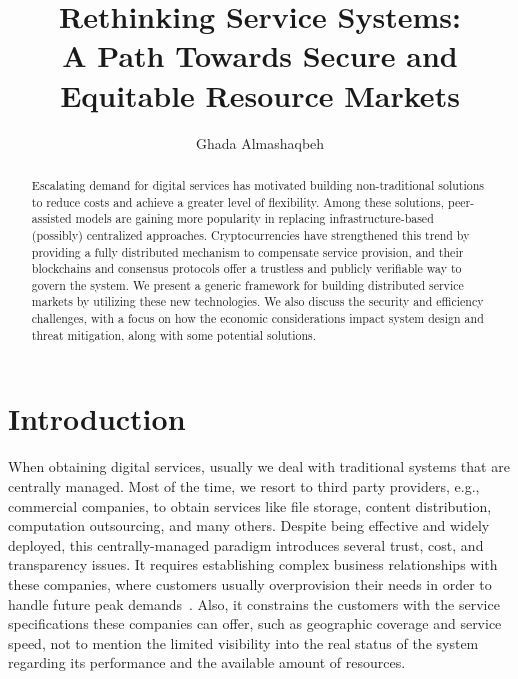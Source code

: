 \documentclass{llncs}
\begin{document}
%
\title{\Large \bf Rethinking Service Systems: \\
A Path Towards Secure and Equitable Resource Markets
}


\author{Ghada Almashaqbeh} 
%
%

\maketitle


\begin{abstract}
Escalating demand for digital services has motivated building non-traditional solutions to reduce costs and achieve a greater level of flexibility. Among these solutions, peer-assisted models are gaining more popularity in replacing infrastructure-based (possibly) centralized approaches. Cryptocurrencies have strengthened this trend by providing a fully distributed mechanism to compensate service provision, and their blockchains and consensus protocols offer a trustless and publicly verifiable way to govern the system. We present a generic framework for building distributed service markets by utilizing these new technologies. We also discuss the security and efficiency challenges, with a focus on how the economic considerations impact system design and threat mitigation, along with some potential solutions.
\end{abstract}


\section{Introduction}
When obtaining digital services, usually we deal with traditional systems that are centrally managed. Most of the time, we resort to third party providers, e.g., commercial companies,  to obtain services like file storage, content distribution, computation outsourcing, and many others. Despite being effective and widely deployed, this centrally-managed paradigm introduces several trust, cost, and transparency issues. It requires establishing complex business relationships with these companies, where customers usually overprovision their needs in order to handle future peak demands~\cite{Kassa13,Nicolae14}. Also, it constrains the customers with the service specifications these companies can offer, such as geographic coverage and service speed, not to mention the limited visibility into the real status of the system regarding its performance and the available amount of resources.
\end{document}
